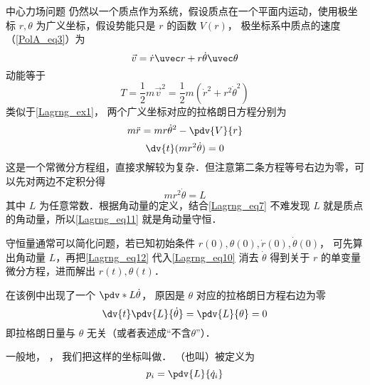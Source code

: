 \begin{exam}{中心力场问题}
仍然以一个质点作为系统，假设质点在一个平面内运动，使用极坐标 $r, \theta$ 为广义坐标，假设势能只是 $r$ 的函数 $V(r)$， 极坐标系中质点的速度（\autoref{PolA_eq3}）为
\begin{equation}\label{Lagrng_eq7}
\vec v = \dot r\uvec r + r\dot \theta \uvec \theta
\end{equation}
动能等于
\begin{equation}
T = \frac12 m\vec v^2 = \frac12 m(\dot r^2 + r^2 \dot \theta^2)
\end{equation}
类似于\autoref{Lagrng_ex1}， 两个广义坐标对应的拉格朗日方程分别为
\begin{equation}\label{Lagrng_eq10}
m\ddot r = mr \dot \theta^2 - \pdv{V}{r}
\end{equation}
\begin{equation}\label{Lagrng_eq11}
\dv{t} (m r^2\dot \theta)  = 0
\end{equation}
这是一个常微分方程组，直接求解较为复杂．但注意第二条方程等号右边为零，可以先对两边不定积分得
\begin{equation}\label{Lagrng_eq12}
mr^2\dot\theta = L
\end{equation}
其中 $L$ 为任意常数．根据角动量的定义，结合\autoref{Lagrng_eq7} 不难发现 $L$ 就是质点的角动量，所以\autoref{Lagrng_eq11} 就是角动量守恒．

守恒量通常可以简化问题，若已知初始条件 $r(0), \theta (0), \dot r(0), \dot\theta (0)$， 可先算出角动量 $L$，再把\autoref{Lagrng_eq12} 代入\autoref{Lagrng_eq10} 消去 $\dot\theta$ 得到关于 $r$ 的单变量微分方程，进而解出 $r(t), \theta (t)$．
\end{exam}

在该例中出现了一个 $\pdv*{L}{\dot\theta}$， 原因是 $\theta$ 对应的拉格朗日方程右边为零
\begin{equation}
\dv{t}\pdv{L}{\dot\theta} = \pdv{L}{\theta} = 0
\end{equation}
即拉格朗日量与 $\theta$ 无关（或者表述成“不含$\theta$”）．

一般地， ， 我们把这样的坐标叫做． （也叫）被定义为
\begin{equation}\label{Lagrng_eq13}
p_i = \pdv{L}{\dot q_i}
\end{equation}

